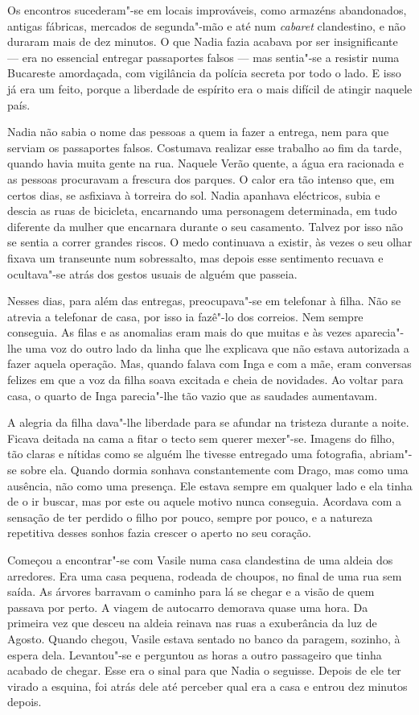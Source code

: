 Os encontros sucederam"-se em locais improváveis,
como armazéns abandonados, antigas fábricas, mercados de segunda"-mão e
até num \emph{cabaret} clandestino, e não duraram mais de dez minutos. O
que Nadia fazia acabava por ser insignificante --- era no essencial
entregar passaportes falsos --- mas sentia"-se a resistir numa Bucareste
amordaçada, com vigilância da polícia secreta por todo o lado.
E isso já era um feito, porque a liberdade de espírito era o mais
difícil de atingir naquele país.

Nadia não sabia o nome das pessoas a quem ia fazer a entrega, nem para
que serviam os passaportes falsos. Costumava realizar esse trabalho ao
fim da tarde, quando havia muita gente na rua. Naquele Verão quente, a
água era racionada e as pessoas procuravam a frescura dos parques. O
calor era tão intenso que, em certos dias, se asfixiava à torreira do
sol. Nadia apanhava eléctricos, subia e descia as ruas de bicicleta,
encarnando uma personagem determinada, em tudo diferente da mulher que
encarnara durante o seu casamento. Talvez por isso não se sentia a
correr grandes riscos. O medo continuava a existir, às vezes o seu olhar
fixava um transeunte num sobressalto, mas depois esse sentimento recuava
e ocultava"-se atrás dos gestos usuais de alguém que passeia.

Nesses dias, para além das entregas, preocupava"-se em
telefonar à filha. Não se atrevia a telefonar de casa, por isso ia
fazê"-lo dos correios. Nem sempre conseguia. As filas e as anomalias eram
mais do que muitas e às vezes aparecia"-lhe uma voz do outro lado da
linha que lhe explicava que não estava autorizada a fazer aquela
operação. Mas, quando falava com Inga e com a mãe, eram conversas
felizes em que a voz da filha soava excitada e cheia de novidades. Ao
voltar para casa, o quarto de Inga parecia"-lhe tão vazio que as saudades aumentavam.

A alegria da filha dava"-lhe liberdade para se afundar na tristeza
durante a noite. Ficava deitada na cama a fitar o tecto sem querer
mexer"-se. Imagens do filho, tão claras e nítidas como se alguém lhe
tivesse entregado uma fotografia, abriam"-se sobre ela. Quando dormia sonhava constantemente com
Drago, mas como uma ausência, não como uma presença. Ele estava sempre
em qualquer lado e ela tinha de o ir buscar, mas por este ou aquele
motivo nunca conseguia. Acordava com a sensação de ter perdido o filho
por pouco, sempre por pouco, e a natureza repetitiva desses sonhos
fazia crescer o aperto no seu coração.

Começou a encontrar"-se com Vasile numa casa clandestina de uma aldeia
dos arredores. Era uma casa pequena, rodeada de choupos, no final de uma
rua sem saída. As árvores barravam o caminho para lá se chegar e a visão
de quem passava por perto. A viagem de autocarro demorava quase uma
hora. Da primeira vez que desceu na aldeia reinava nas ruas a
exuberância da luz de Agosto. Quando chegou, Vasile estava sentado no
banco da paragem, sozinho, à espera dela. Levantou"-se e perguntou as
horas a outro passageiro que tinha acabado de chegar. Esse era o sinal
para que Nadia o seguisse. Depois de ele ter virado a esquina, foi atrás
dele até perceber qual era a casa e entrou dez minutos depois.

